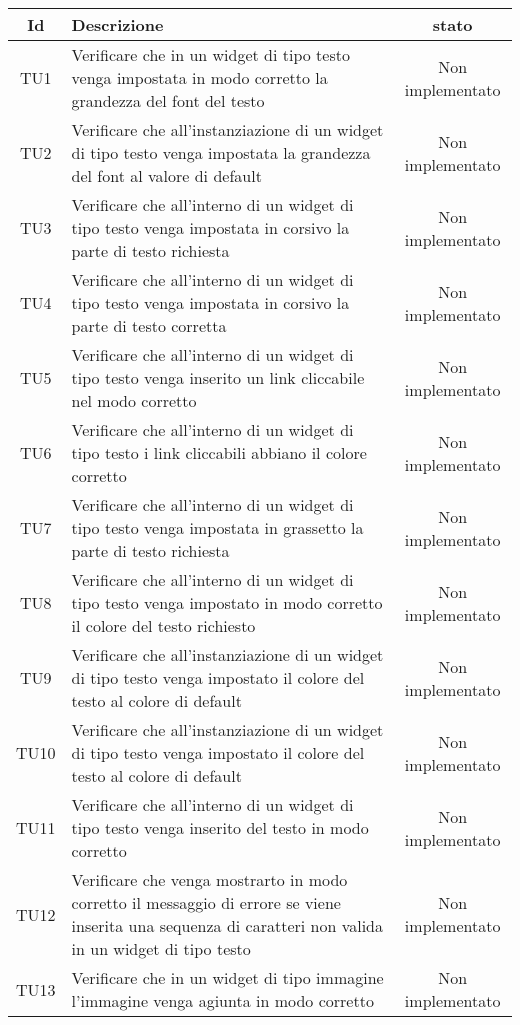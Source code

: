 \begin{center}
	\begin{longtable}{|c|>{\centering}m{7cm}|c|}\hline
		Id & Descrizione & stato \\ \hline
		TU1 & Verificare che in un widget di tipo testo venga impostata in modo corretto la grandezza del font del testo & Non implementato \\ \hline
		TU2 & Verificare che all'instanziazione di un widget di tipo testo venga impostata la grandezza del font al valore di default & Non implementato \\ \hline
		TU3 & Verificare che all'interno di un widget di tipo testo venga impostata in corsivo la parte di testo richiesta & Non implementato \\ \hline
		TU4 & Verificare che all'interno di un widget di tipo testo venga impostata in corsivo la parte di testo corretta & Non implementato \\ \hline
		TU5 & Verificare che all'interno di un widget di tipo testo venga inserito un link cliccabile nel modo corretto & Non implementato \\ \hline
		TU6 & Verificare che all'interno di un widget di tipo testo i link cliccabili abbiano il colore corretto & Non implementato \\ \hline
		TU7 & Verificare che all'interno di un widget di tipo testo venga impostata in grassetto la parte di testo richiesta & Non implementato \\ \hline
		TU8 & Verificare che all'interno di un widget di tipo testo venga impostato in modo corretto il colore del testo richiesto & Non implementato \\ \hline
		TU9 & Verificare che all'instanziazione di un widget di tipo testo venga impostato il colore del testo al colore di default & Non implementato \\ \hline
		TU10 & Verificare che all'instanziazione di un widget di tipo testo venga impostato il colore del testo al colore di default & Non implementato \\ \hline
		TU11 & Verificare che all'interno di un widget di tipo testo venga inserito del testo in modo corretto & Non implementato \\ \hline
		TU12 & Verificare che venga mostrarto in modo corretto il messaggio di errore se viene inserita una sequenza di caratteri non valida in un widget di tipo testo & Non implementato \\ \hline
		TU13 & Verificare che in un widget di tipo immagine l'immagine venga agiunta in modo corretto & Non implementato \\ \hline

\end{longtable}
\end{center}
